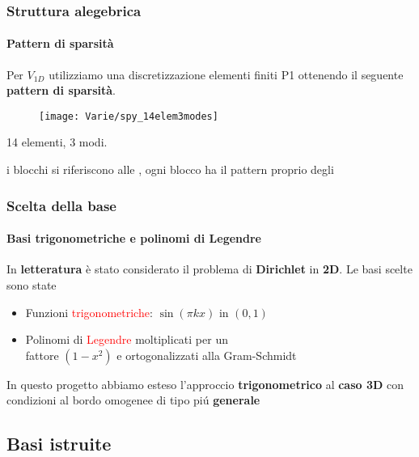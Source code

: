  \begin{frame}
  \frametitle{Struttura alegebrica}
  \framesubtitle{Pattern di sparsit\`a}
  Per $V_{1D}$ utilizziamo una discretizzazione elementi finiti P1 ottenendo il seguente 
  \textbf{pattern di 
  sparsit\`a}.
  
  \begin{figure}
   \centering
  \texttt{[image: Varie/spy\_14elem3modes]}
 
  \end{figure}
  \begin{center} 14 elementi, 3 modi.\end{center}
  
  \textbf{} i blocchi si riferiscono alle , ogni blocco ha il pattern proprio degli 
 \end{frame}

\begin{frame}
 \frametitle{Scelta della base}
 \framesubtitle{Basi trigonometriche e polinomi di Legendre}
 In \textbf{letteratura} \`e stato considerato il problema di \textbf{Dirichlet} in \textbf{2D}.
 Le basi scelte sono state
 \begin{itemize}
  \item Funzioni \textcolor{red}{trigonometriche}: $\sin(\pi k x)\text{ in }(0,1)$ 
  \item Polinomi di \textcolor{red}{Legendre} moltiplicati per un \\fattore $(1-x^2)$ e ortogonalizzati alla Gram-Schmidt 
 \end{itemize}
\begin{alertblock}{In questo progetto}
 abbiamo esteso l'approccio \textbf{trigonometrico} al \textbf{caso 3D} con condizioni al bordo omogenee di tipo pi\'u \textbf{generale}
\end{alertblock}

\end{frame}

 
\subsection{Basi istruite}

\begin{frame}
\end{frame}

